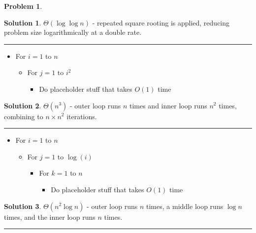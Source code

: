 \documentclass{article}
\theoremstyle{definition}
\newtheorem{problem}{Problem}
\def\fline{\rule{0.75\linewidth}{0.5pt}}
\newcommand{\finishline}{\begin{center}\fline\end{center}}
\newtheorem*{solution*}{Solution}
\newenvironment{solution}{\begin{solution*}}{{\finishline} \end{solution*}}
\begin{document}
\begin{problem}
\begin{enumerate}[label =\alph*)]
 \begin{solution}
	\item $\Theta(\log \log n)$ - repeated square rooting is applied, reducing problem size logarithmically at a double rate. 
\end{solution}

\item 

\begin{itemize}
	\item For $i = 1$ to $n$
	\begin{itemize}
		\item For $j = 1$ to $i^2$
		\begin{itemize}
			\item Do placeholder stuff that takes $O(1)$ time
		\end{itemize}
	\end{itemize}
	\end{itemize}
 \begin{solution}
	\item $\Theta(n^3)$ - outer loop runs $n$ times and inner loop runs $n^2$ times, combining to $n \times n^2$ iterations. 
\end{solution}

\item 
\begin{itemize}
	\item For $i = 1$ to $n$
	\begin{itemize}
		\item For $j = 1$ to $\log(i)$
		\begin{itemize}
			\item For $k = 1$ to $n$
			\begin{itemize}
				\item Do placeholder stuff that takes $O(1)$ time
			\end{itemize}
			\end{itemize}
		\end{itemize}
	\end{itemize}
 \begin{solution}
	\item $\Theta(n^2 \log n)$ - outer loop runs $n$ times, a middle loop runs $\log n$ times, and the inner loop runs $n$ times. 
\end{solution}

\end{enumerate}

\end{problem}
\end{document}
